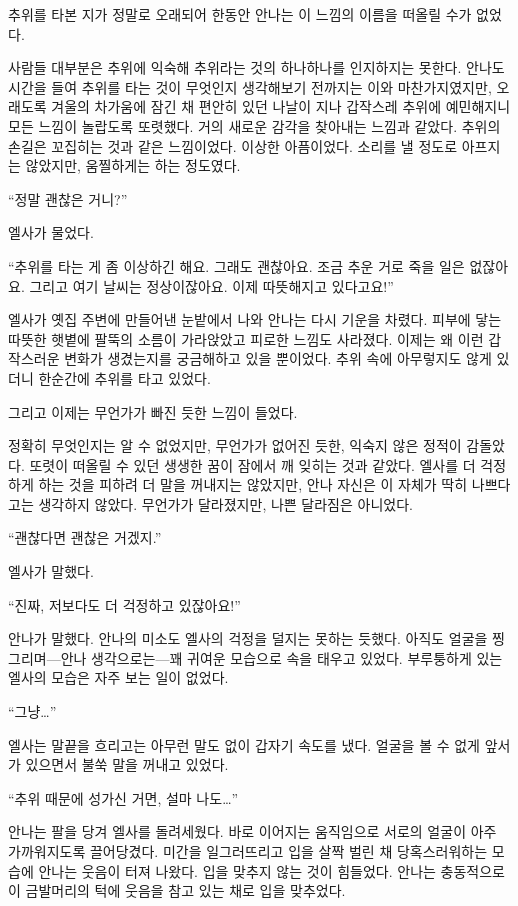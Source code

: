 추위를 타본 지가 정말로 오래되어 한동안 안나는 이 느낌의 이름을 떠올릴 수가 없었다.

사람들 대부분은 추위에 익숙해 추위라는 것의 하나하나를 인지하지는 못한다. 안나도 시간을 들여 추위를 타는 것이 무엇인지 생각해보기 전까지는 이와 마찬가지였지만, 오래도록 겨울의 차가움에 잠긴 채 편안히 있던 나날이 지나 갑작스레 추위에 예민해지니 모든 느낌이 놀랍도록 또렷했다. 거의 새로운 감각을 찾아내는 느낌과 같았다. 추위의 손길은 꼬집히는 것과 같은 느낌이었다. 이상한 아픔이었다. 소리를 낼 정도로 아프지는 않았지만, 움찔하게는 하는 정도였다.

``정말 괜찮은 거니?''

엘사가 물었다.

``추위를 타는 게 좀 이상하긴 해요. 그래도 괜찮아요. 조금 추운 거로 죽을 일은 없잖아요. 그리고 여기 날씨는 정상이잖아요. 이제 따뜻해지고 있다고요!''

엘사가 옛집 주변에 만들어낸 눈밭에서 나와 안나는 다시 기운을 차렸다. 피부에 닿는 따뜻한 햇볕에 팔뚝의 소름이 가라앉았고 피로한 느낌도 사라졌다. 이제는 왜 이런 갑작스러운 변화가 생겼는지를 궁금해하고 있을 뿐이었다. 추위 속에 아무렇지도 않게 있더니 한순간에 추위를 타고 있었다.

그리고 이제는 무언가가 빠진 듯한 느낌이 들었다.

정확히 무엇인지는 알 수 없었지만, 무언가가 없어진 듯한, 익숙지 않은 정적이 감돌았다. 또렷이 떠올릴 수 있던 생생한 꿈이 잠에서 깨 잊히는 것과 같았다. 엘사를 더 걱정하게 하는 것을 피하려 더 말을 꺼내지는 않았지만, 안나 자신은 이 자체가 딱히 나쁘다고는 생각하지 않았다. 무언가가 달라졌지만, 나쁜 달라짐은 아니었다.

``괜찮다면 괜찮은 거겠지.''

엘사가 말했다.

``진짜, 저보다도 더 걱정하고 있잖아요!''

안나가 말했다. 안나의 미소도 엘사의 걱정을 덜지는 못하는 듯했다. 아직도 얼굴을 찡그리며—안나 생각으로는—꽤 귀여운 모습으로 속을 태우고 있었다. 부루퉁하게 있는 엘사의 모습은 자주 보는 일이 없었다.

``그냥\ldots''

엘사는 말끝을 흐리고는 아무런 말도 없이 갑자기 속도를 냈다. 얼굴을 볼 수 없게 앞서 가 있으면서 불쑥 말을 꺼내고 있었다.

``추위 때문에 성가신 거면, 설마 나도\ldots''

안나는 팔을 당겨 엘사를 돌려세웠다. 바로 이어지는 움직임으로 서로의 얼굴이 아주 가까워지도록 끌어당겼다. 미간을 일그러뜨리고 입을 살짝 벌린 채 당혹스러워하는 모습에 안나는 웃음이 터져 나왔다. 입을 맞추지 않는 것이 힘들었다. 안나는 충동적으로 이 금발머리의 턱에 웃음을 참고 있는 채로 입을 맞추었다.

